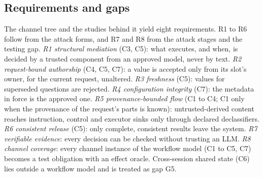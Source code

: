 \documentclass[pdflatex,sn-mathphys-num]{sn-jnl}
\theoremstyle{thmstyleone}%
\theoremstyle{thmstyletwo}%
\theoremstyle{thmstylethree}%
\begin{document}
\subsection{Requirements and gaps}\label{sec:tax-req}

The channel tree and the studies behind it yield eight requirements. R1 to R6 follow from the attack forms, and R7 and R8 from the attack stages and the testing gap.
\emph{R1 structural mediation} (C3, C5): what executes, and when, is decided by a trusted component from an approved model, never by text. \emph{R2 request-bound authorship} (C4, C5, C7): a value is accepted only from its slot's owner, for the current request, unaltered. \emph{R3 freshness} (C5): values for superseded questions are rejected. \emph{R4 configuration integrity} (C7): the metadata in force is the approved one. \emph{R5 provenance-bounded flow} (C1 to C4; C1 only when the provenance of the request's parts is known): untrusted-derived content reaches instruction, control and executor sinks only through declared declassifiers. \emph{R6 consistent release} (C5): only complete, consistent results leave the system. \emph{R7 verifiable evidence}: every decision can be checked without trusting an LLM. \emph{R8 channel coverage}: every channel instance of the workflow model (C1 to C5, C7) becomes a test obligation with an effect oracle. Cross-session shared state (C6) lies outside a workflow model and is treated as gap G5.
\end{document}
